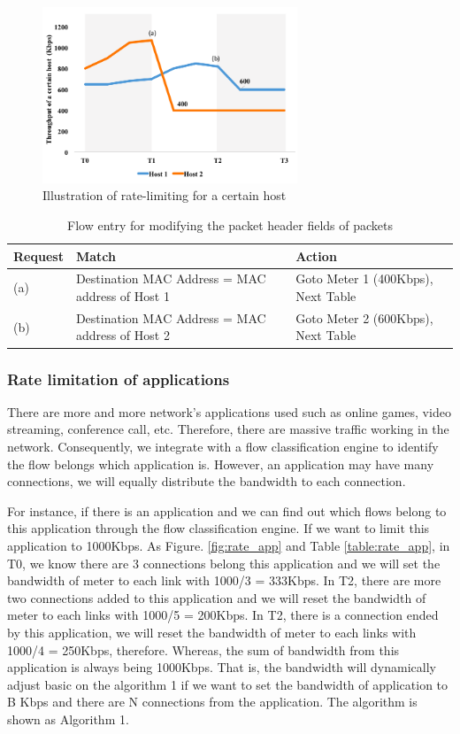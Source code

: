 \documentclass[journal]{IEEEtran}
\begin{document}
\begin{figure}[!t]
\centering
\includegraphics[width=3in]{./figures/rate_host}
\caption{Illustration of rate-limiting for a certain host}
\label{fig:rate_host}
\end{figure}

\begin{table}[]
\centering
\begin{tabular}{|l|l|l|}
\hline
Request  & Match                                             & Action                             \\ \hline
(a)      & Destination MAC Address = MAC address of Host 1   & Goto Meter 1 (400Kbps), Next Table \\ \hline
(b)      & Destination MAC Address = MAC address of Host 2   & Goto Meter 2 (600Kbps), Next Table \\ \hline
\end{tabular}
\caption{Flow entry for modifying the packet header fields of packets}
\label{table:rate_host}
\end{table}



\subsubsection{Rate limitation of applications}
There are more and more network’s applications used such as online games, video streaming, conference call, etc. Therefore, there are massive traffic working in the network. Consequently, we integrate with a flow classification engine to identify the flow belongs which application is.
However, an application may have many connections, we will equally distribute the bandwidth to each connection.

For instance, if there is an application and we can find out which flows belong to this application through the flow classification engine. If we want to limit this application to 1000Kbps. As Figure. \ref{fig:rate_app} and Table \ref{table:rate_app}, in T0, we know there are 3 connections belong this application and we will set the bandwidth of meter to each link with 1000/3 = 333Kbps. In T2, there are more two connections added to this application and we will reset the bandwidth of meter to each links with 1000/5 = 200Kbps. In T2, there is a connection ended by this application, we will reset the bandwidth of meter to each links with 1000/4 = 250Kbps, therefore.
Whereas, the sum of bandwidth from this application is always being 1000Kbps. That is, the bandwidth will dynamically adjust basic on the algorithm 1 if we want to set the bandwidth of application to B Kbps and there are N connections from the application. The algorithm is shown as Algorithm 1.
\end{document}
